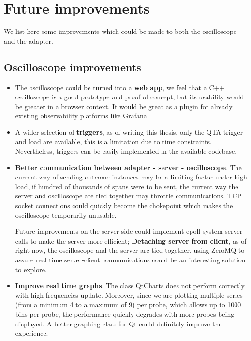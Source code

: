     \section{Future improvements}
     We list here some improvements which could be made to both the oscilloscope and the adapter.
        \subsection{Oscilloscope improvements}
           \begin{itemize}
            
                \item The oscilloscope could be turned into a \textbf{web app}, we feel that a C++ oscilloscope is a good prototype and proof of concept, but its usability would be greater in a browser context. It would be great as a plugin for already existing observability platforms like Grafana.
            
                \item A wider selection of \textbf{triggers}, as of writing this thesis, only the QTA trigger and load are available, this is a limitation due to time constraints. Nevertheless, triggers can be easily implemented in the available codebase.
            
                \item \textbf{Better communication between adapter - server - oscilloscope}. The current way of sending outcome instances may be a limiting factor under high load, if hundred of thousands of spans were to be sent, the current way the server and oscilloscope are tied together may throttle communications. TCP socket connections could quickly become the chokepoint which makes the oscilloscope temporarily unusable.

                    Future improvements on the server side could implement epoll system server calls to make the server more efficient; \textbf{Detaching server from client}, as of right now, the oscilloscope and the server are tied together, using ZeroMQ \cite{zero-mq} to assure real time server-client communications could be an interesting solution to explore.

                \item \textbf{Improve real time graphs}. The class QtCharts does not perform correctly with high frequencies update. Moreover, since we are plotting multiple series (from a minimum 4 to a maximum of 9) per probe, which allows up to 1000 bins per probe, the performance quickly degrades with more probes being displayed. A better graphing class for Qt could definitely improve the experience.


\end{itemize}

